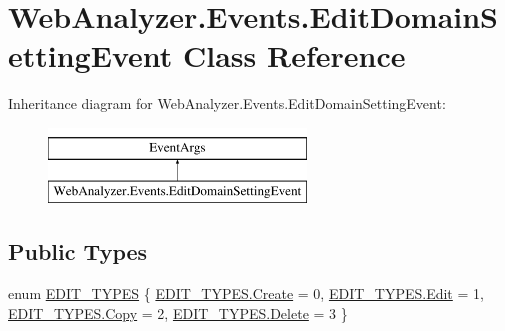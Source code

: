 \hypertarget{class_web_analyzer_1_1_events_1_1_edit_domain_setting_event}{}\section{Web\+Analyzer.\+Events.\+Edit\+Domain\+Setting\+Event Class Reference}
\label{class_web_analyzer_1_1_events_1_1_edit_domain_setting_event}
Inheritance diagram for Web\+Analyzer.\+Events.\+Edit\+Domain\+Setting\+Event\+:\begin{figure}[H]
\begin{center}
\leavevmode
\includegraphics[height=2.000000cm]{class_web_analyzer_1_1_events_1_1_edit_domain_setting_event}
\end{center}
\end{figure}
\subsection*{Public Types}
\begin{DoxyCompactItemize}
\item 
enum \hyperlink{class_web_analyzer_1_1_events_1_1_edit_domain_setting_event_a1a22be020f4b06370ab3a64893272b44}{E\+D\+I\+T\+\_\+\+T\+Y\+P\+E\+S} \{ \hyperlink{class_web_analyzer_1_1_events_1_1_edit_domain_setting_event_a1a22be020f4b06370ab3a64893272b44a686e697538050e4664636337cc3b834f}{E\+D\+I\+T\+\_\+\+T\+Y\+P\+E\+S.\+Create} = 0, 
\hyperlink{class_web_analyzer_1_1_events_1_1_edit_domain_setting_event_a1a22be020f4b06370ab3a64893272b44a7dce122004969d56ae2e0245cb754d35}{E\+D\+I\+T\+\_\+\+T\+Y\+P\+E\+S.\+Edit} = 1, 
\hyperlink{class_web_analyzer_1_1_events_1_1_edit_domain_setting_event_a1a22be020f4b06370ab3a64893272b44a5fb63579fc981698f97d55bfecb213ea}{E\+D\+I\+T\+\_\+\+T\+Y\+P\+E\+S.\+Copy} = 2, 
\hyperlink{class_web_analyzer_1_1_events_1_1_edit_domain_setting_event_a1a22be020f4b06370ab3a64893272b44af2a6c498fb90ee345d997f888fce3b18}{E\+D\+I\+T\+\_\+\+T\+Y\+P\+E\+S.\+Delete} = 3
 \}
\end{DoxyCompactItemize}
